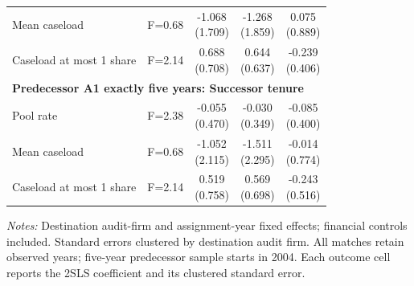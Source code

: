 \begin{table}[htbp]
\begin{threeparttable}
\begin{tabular}{p{}cccc}
Mean caseload & F=0.68 & \shortstack{-1.068\\(1.709)} & \shortstack{-1.268\\(1.859)} & \shortstack{0.075\\(0.889)} \\
Caseload at most 1 share & F=2.14 & \shortstack{0.688\\(0.708)} & \shortstack{0.644\\(0.637)} & \shortstack{-0.239\\(0.406)} \\
\multicolumn{5}{l}{\textbf{Predecessor A1 exactly five years: Successor tenure}} \\
Pool rate & F=2.38 & \shortstack{-0.055\\(0.470)} & \shortstack{-0.030\\(0.349)} & \shortstack{-0.085\\(0.400)} \\
Mean caseload & F=0.68 & \shortstack{-1.052\\(2.115)} & \shortstack{-1.511\\(2.295)} & \shortstack{-0.014\\(0.774)} \\
Caseload at most 1 share & F=2.14 & \shortstack{0.519\\(0.758)} & \shortstack{0.569\\(0.698)} & \shortstack{-0.243\\(0.516)} \\
\bottomrule
\end{tabular}
\begin{tablenotes}\footnotesize
\item \raggedright \textit{Notes:} Destination audit-firm and assignment-year fixed effects; financial controls included. Standard errors clustered by destination audit firm. All matches retain observed years; five-year predecessor sample starts in 2004. Each outcome cell reports the 2SLS coefficient and its clustered standard error.
\end{tablenotes}
\end{threeparttable}
\end{table}
